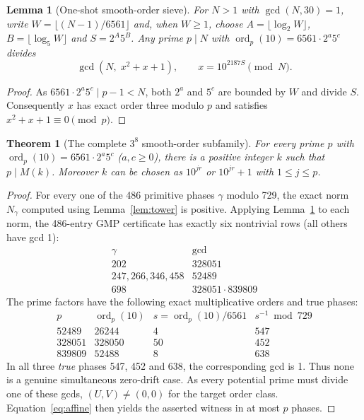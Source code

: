\documentclass[9pt]{extarticle}
\newtheorem{theorem}{Theorem}
\newtheorem{lemma}{Lemma}
\DeclareMathOperator{\ord}{ord}
\begin{document}
\begin{lemma}[One-shot smooth-order sieve]\label{lem:sieve}
For $N>1$ with $\gcd(N,30)=1$, write
$W=\lfloor(N-1)/6561\rfloor$ and, when $W\ge1$, choose
$A=\lfloor\log_2W\rfloor$, $B=\lfloor\log_5W\rfloor$ and $S=2^A5^B$. Any prime $p\mid N$ with $\ord_p(10)=6561\cdot2^a5^c$ divides
\[
\gcd\left(N,\;x^2+x+1\right),\qquad x=10^{2187S}\pmod N.
\]
\end{lemma}
\begin{proof}
As $6561\cdot2^a5^c\mid p-1<N$, both $2^a$ and $5^c$ are bounded by $W$ and divide $S$. Consequently $x$ has exact order three modulo $p$ and satisfies $x^2+x+1\equiv0\pmod p$.
\end{proof}
\begin{theorem}[The complete $3^8$ smooth-order subfamily]
For every prime $p$ with $\ord_p(10)=6561\cdot2^a5^c$ ($a,c\ge0$), there is a positive integer $k$ such that $p\mid M(k)$. Moreover $k$ can be chosen as $10^{jr}$ or $10^{jr}+1$ with $1\le j\le p$.
\end{theorem}
\begin{proof}
For every one of the 486 primitive phases $\gamma$ modulo 729, the exact norm $N_\gamma$ computed using Lemma~\ref{lem:tower} is positive. Applying Lemma~\ref{lem:sieve} to each norm, the 486-entry GMP certificate has exactly six nontrivial rows (all others have gcd 1):
\[
\begin{array}{c|c}
\gamma&\gcd\\\hline
202&328051\\
247,266,346,458&52489\\
698&328051\cdot839809
\end{array}
\]
The prime factors have the following exact multiplicative orders and true phases:
\[
\begin{array}{r|r|r|r}
p&\ord_p(10)&s=\ord_p(10)/6561&s^{-1}\bmod729\\\hline
52489&26244&4&547\\
328051&328050&50&452\\
839809&52488&8&638
\end{array}
\]
In all three \emph{true} phases 547, 452 and 638, the corresponding gcd is 1. Thus none is a genuine simultaneous zero-drift case. As every potential prime must divide one of these gcds, $(U,V)\ne(0,0)$ for the target order class. Equation~\eqref{eq:affine} then yields the asserted witness in at most $p$ phases.
\end{proof}
\end{document}
